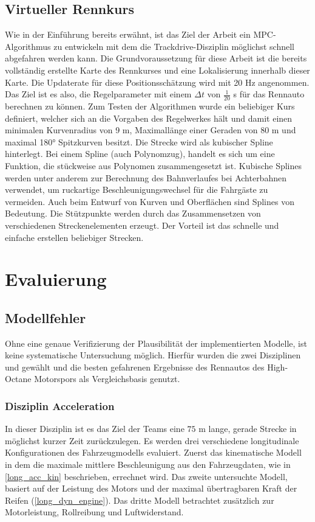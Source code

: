 \documentclass{like}
\begin{document}
\section{Virtueller Rennkurs}
Wie in der Einführung bereits erwähnt, ist das Ziel der Arbeit ein \ac{MPC}-Algorithmus zu entwickeln mit dem die Trackdrive-Disziplin möglichst schnell abgefahren werden kann. Die Grundvoraussetzung für diese Arbeit ist die bereits vollständig erstellte Karte des Rennkurses und eine Lokalisierung innerhalb dieser Karte. Die Updaterate für diese Positionsschätzung wird mit 20 Hz angenommen. Das Ziel ist es also, die Regelparameter mit einem $\Delta t$ von $\frac{1}{20}$ s für das Rennauto berechnen zu können.  Zum Testen der Algorithmen wurde ein beliebiger Kurs definiert, welcher sich an die Vorgaben des Regelwerkes hält und damit einen minimalen Kurvenradius von 9 m, Maximallänge einer Geraden von 80 m und maximal 180° Spitzkurven besitzt. Die Strecke wird als kubischer Spline hinterlegt. Bei einem Spline (auch Polynomzug), handelt es sich um eine Funktion, die stückweise aus Polynomen zusammengesetzt ist. Kubische Splines werden unter anderem zur Berechnung des Bahnverlaufes bei Achterbahnen verwendet, um ruckartige Beschleunigungswechsel für die Fahrgäste zu vermeiden. Auch beim Entwurf von Kurven und Oberflächen sind Splines von Bedeutung. Die Stützpunkte werden durch das Zusammensetzen von verschiedenen Streckenelementen erzeugt. Der Vorteil ist das schnelle und einfache erstellen beliebiger Strecken. 

\chapter{Evaluierung}
\section{Modellfehler}
\label{modelError}
Ohne eine genaue Verifizierung der Plausibilität der implementierten Modelle, ist keine systematische Untersuchung möglich. Hierfür wurden die zwei Disziplinen  und  gewählt und die besten gefahrenen Ergebnisse des Rennautos des High-Octane Motorspors als Vergleichsbasis genutzt.


\subsection{Disziplin Acceleration}
In dieser Disziplin ist es das Ziel der Teams eine $75$ m lange, gerade Strecke in möglichst kurzer Zeit zurückzulegen.
Es werden drei verschiedene longitudinale Konfigurationen des Fahrzeugmodells evaluiert. Zuerst das kinematische Modell in dem die maximale mittlere Beschleunigung aus den Fahrzeugdaten, wie in \ref{long_acc_kin} beschrieben, errechnet wird. Das zweite untersuchte Modell, basiert auf der Leistung des Motors und der maximal übertragbaren Kraft der Reifen (\ref{long_dyn_engine}).
Das dritte Modell betrachtet zusätzlich zur Motorleistung, Rollreibung und Luftwiderstand. 
\end{document}
